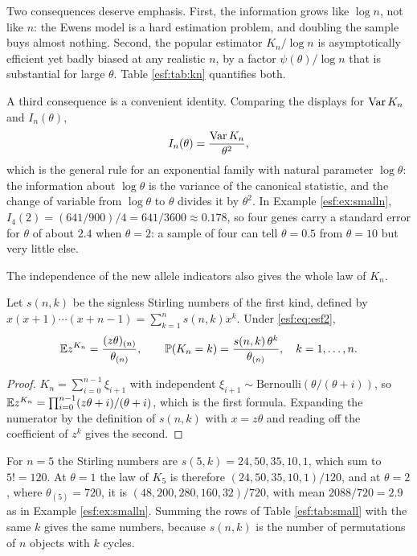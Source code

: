 Two consequences deserve emphasis. First, the information grows like $\log n$, not
like $n$: the Ewens model is a hard estimation problem, and doubling the sample buys
almost nothing. Second, the popular estimator $K_n/\log n$ is asymptotically efficient
yet badly biased at any realistic $n$, by a factor $\psi(\theta)/\log n$ that is
substantial for large $\theta$. Table \ref{esf:tab:kn} quantifies both.

A third consequence is a convenient identity. Comparing the displays for $\operatorname{Var} K_n$ and
$I_n(\theta)$,
\begin{equation}
I_n(\theta) = \frac{\operatorname{Var} K_n}{\theta^{2}} ,
\label{esf:eq:infovar}
\end{equation}
which is the general rule for an exponential family with natural parameter
$\log\theta$: the information about $\log\theta$ is the variance of the canonical
statistic, and the change of variable from $\log\theta$ to $\theta$ divides it by
$\theta^{2}$. In Example \ref{esf:ex:smalln}, $I_4(2) = (641/900)/4 = 641/3600 \approx
0.178$, so four genes carry a standard error for $\theta$ of about $2.4$ when
$\theta = 2$: a sample of four can tell $\theta = 0.5$ from $\theta = 10$ but very
little else.

The independence of the new allele indicators also gives the whole law of $K_n$.

\begin{corollary}
\label{esf:cor:stirling}
Let $s(n,k)$ be the signless Stirling numbers of the first kind, defined by
$x(x+1)\cdots(x+n-1) = \sum_{k=1}^{n} s(n,k) x^{k}$. Under \eqref{esf:eq:esf2},
\begin{equation}
\mathbb{E} z^{K_n} = \frac{(z\theta)_{(n)}}{\theta_{(n)}}, \qquad
\mathbb{P}(K_n = k) = \frac{s(n,k) \, \theta^{k}}{\theta_{(n)}}, \quad k = 1, \dots, n.
\label{esf:eq:stirling}
\end{equation}
\end{corollary}

\begin{proof}
$K_n = \sum_{i=0}^{n-1} \xi_{i+1}$ with independent $\xi_{i+1} \sim
\mathrm{Bernoulli}(\theta/(\theta+i))$, so
$\mathbb{E} z^{K_n} = \prod_{i=0}^{n-1} (z\theta + i)/(\theta + i)$, which is the first
formula. Expanding the numerator by the definition of $s(n,k)$ with $x = z\theta$ and
reading off the coefficient of $z^{k}$ gives the second.
\end{proof}

For $n = 5$ the Stirling numbers are $s(5,k) = 24, 50, 35, 10, 1$, which sum to
$5! = 120$. At $\theta = 1$ the law of $K_5$ is therefore
$(24, 50, 35, 10, 1)/120$, and at $\theta = 2$, where $\theta_{(5)} = 720$, it is
$(48, 200, 280, 160, 32)/720$, with mean $2088/720 = 2.9$ as in Example
\ref{esf:ex:smalln}. Summing the rows of Table \ref{esf:tab:small} with the same $k$
gives the same numbers, because $s(n,k)$ is the number of permutations of $n$ objects
with $k$ cycles.

